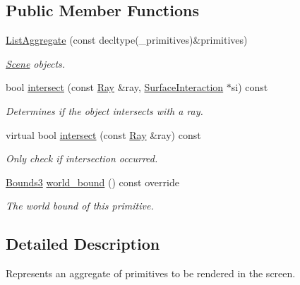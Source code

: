 \subsection*{Public Member Functions}
\begin{DoxyCompactItemize}
\item 
\mbox{\label{classomg_1_1_list_aggregate_a80d0fc549ba77def8767c0e10a774a49}} 
\mbox{\hyperlink{classomg_1_1_list_aggregate_a80d0fc549ba77def8767c0e10a774a49}{List\+Aggregate}} (const decltype(\+\_\+primitives)\&primitives)
\begin{DoxyCompactList}\small\item\em \mbox{\hyperlink{classomg_1_1_scene}{Scene}} objects. \end{DoxyCompactList}\item 
bool \mbox{\hyperlink{classomg_1_1_list_aggregate_a55fdd3b0fa387cb14488b86634b3e877}{intersect}} (const \mbox{\hyperlink{classomg_1_1_ray}{Ray}} \&ray, \mbox{\hyperlink{classomg_1_1_surface_interaction}{Surface\+Interaction}} $\ast$si) const
\begin{DoxyCompactList}\small\item\em Determines if the object intersects with a ray. \end{DoxyCompactList}\item 
virtual bool \mbox{\hyperlink{classomg_1_1_list_aggregate_ac3abd78ca5ce87eb3821bf19bf5194cf}{intersect}} (const \mbox{\hyperlink{classomg_1_1_ray}{Ray}} \&ray) const
\begin{DoxyCompactList}\small\item\em Only check if intersection occurred. \end{DoxyCompactList}\item 
\mbox{\hyperlink{classomg_1_1_bounds3}{Bounds3}} \mbox{\hyperlink{classomg_1_1_list_aggregate_a8c7b3a6c7c8a087355a1a35519c79555}{world\+\_\+bound}} () const override
\begin{DoxyCompactList}\small\item\em The world bound of this primitive. \end{DoxyCompactList}\end{DoxyCompactItemize}


\subsection{Detailed Description}
Represents an aggregate of primitives to be rendered in the screen. 

